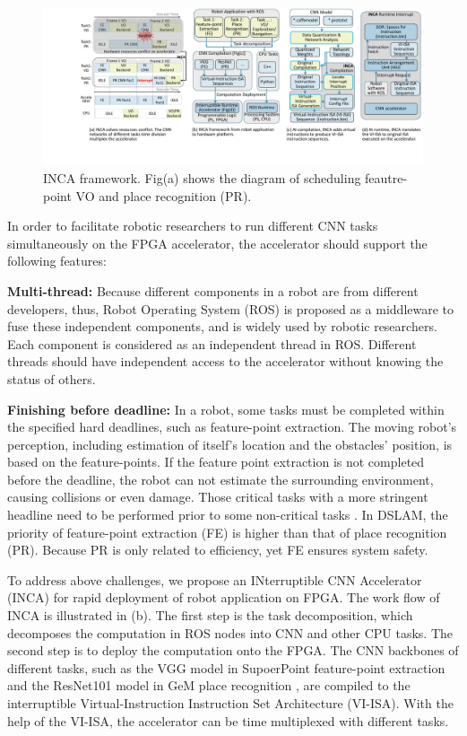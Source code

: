 \begin{figure}[t]
	\centering
 \includegraphics[width=0.99\linewidth]{fig/inca.pdf}
 \caption{ INCA framework. Fig(a) shows the diagram of scheduling feautre-point VO and place recognition (PR).
 }
	\label{fig:inca}
\end{figure}

In order to facilitate robotic researchers to run different CNN tasks simultaneously on the FPGA accelerator, the accelerator should support the following features:

\textbf{Multi-thread:} Because different components in a robot are from different developers, thus, Robot Operating System (ROS) \cite{quigley2009ros} is proposed as a middleware to fuse these independent components, and is widely used by robotic researchers. Each component is considered as an independent thread in ROS. Different threads should have independent access to the accelerator without knowing the status of others.

\textbf{Finishing before deadline:} In a robot, some tasks must be completed within the specified hard deadlines, such as feature-point extraction. The moving robot's perception, including estimation of itself's location and the obstacles' position, is based on the feature-points. If the feature point extraction is not completed before the deadline, the robot can not estimate the surrounding environment, causing collisions or even damage. Those critical tasks with a more stringent headline need to be performed prior to some non-critical tasks \cite{RamsauerKLM17}. In DSLAM, the priority of feature-point extraction (FE) is higher than that of place recognition (PR). Because PR is only related to efficiency, yet FE ensures system safety.

To address above challenges, we propose an INterruptible CNN Accelerator (INCA) for rapid deployment of robot application on FPGA. 
The work flow of INCA is illustrated in (b). 
The first step is the task decomposition, which decomposes the computation in ROS nodes into CNN and other CPU tasks.
The second step is to deploy the computation onto the FPGA. 
The CNN backbones of different tasks, such as the VGG model \cite{kim2016accurate} in SupoerPoint feature-point extraction \cite{detone2018superpoint} and the ResNet101 model \cite{he2016deep} in GeM place recognition \cite{radenovic2018fine}, are compiled to the interruptible Virtual-Instruction Instruction Set Architecture (VI-ISA). With the help of the VI-ISA, the accelerator can be time multiplexed with different tasks.


